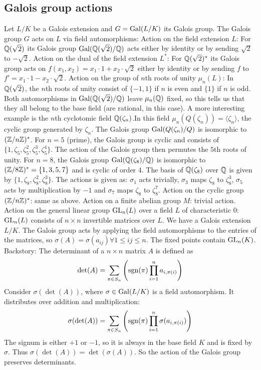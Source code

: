 \subsection{Galois group actions}
\begin{outline}
\0 Let $L/K$ be a Galois extension and $G=\operatorname{Gal}({L/K})$ its Galois group. The Galois group $G$ acts on $L$ via field automorphisms:
    \1 Action on the field extension $L$: For $\mathbb{Q}(\sqrt{2})$ its Galois group $\operatorname{Gal}({\mathbb{Q}(\sqrt{2})/\mathbb{Q}})$ acts either by identity or by sending $\sqrt{2}$ to $-\sqrt{2}$.
    \1 Action on the dual of the field extension $L^*$: For $\mathbb{Q}(\sqrt{2})^*$ its Galois group acts on $f(x_1,x_2)=x_1\cdot 1 + x_2 \cdot \sqrt{2}$ either by identity or by sending $f$ to $f'=x_1\cdot 1 -x_2 \cdot \sqrt{2}$.
    \1 Action on the group of $n$th roots of unity $\mu_n(L)$: 
        \2 In $\mathbb{Q}(\sqrt{2})$, the $n$th roots of unity consist of $\{-1,1\}$ if $n$ is even and $\{1\}$ if $n$ is odd. Both automorphisms in $\operatorname{Gal}({\mathbb{Q}(\sqrt{2})/\mathbb{Q}})$ leave $\mu_n(\mathbb{Q})$ fixed, so this tells us that they all belong to the base field (are rational, in this case). 
        \2 A more interesting example is the $n$th cyclotomic field $\mathbb{Q}(\zeta_n)$.In this field $\mu_n (Q(\zeta_n))=\langle \zeta_n \rangle$, the cyclic group generated by $\zeta_n$. The Galois group $\operatorname{Gal}({Q(\zeta_n)/Q})$ is isomorphic to $(\mathbb{Z}/n\mathbb{Z})^*$. For $n=5$ (prime), the Galois group is cyclic and consists of $\{1, \zeta_5, \zeta_5^2, \zeta_5^3, \zeta_5^4\}$. The action of the Galois group then permutes the $5$th roots of unity. For $n=8$, the Galois group $\operatorname{Gal}({\mathbb{Q}(\zeta_8)/\mathbb{Q}})$ is isomorphic to $(\mathbb{Z}/8\mathbb{Z})^*=\{1,3,5,7\}$ and is cyclic of order $4$. The basis of $\mathbb{Q}(\zeta_8)$ over $\mathbb{Q}$ is given by $\{1,\zeta_8,\zeta_8^2, \zeta_8^3\}$. The actions is given as: $\sigma_1$ acts trivially, $\sigma_3$ maps $\zeta_8$ to $\zeta_8^3$, $\sigma_5$ acts by multiplication by $-1$ and $\sigma_7$ maps $\zeta_8$ to $\zeta^7_8$.
    \1 Action on the cyclic group $(\mathbb{Z}/n\mathbb{Z})^*$: same as above.
    \1 Action on a finite abelian group $M$: trivial action.
    \1 Action on the general linear group $\operatorname{GL}_n(L)$ over a field $L$ of characteristic $0$: $\operatorname{GL}_n(L)$ consists of $n\times n$ invertible matrices over $L$. We have a Galois extension $L/K$. The Galois group acts by applying the field automorphisms to the entries of the matrices, so $\sigma(A)=\sigma(a_{ij}) \forall 1\leq ij \leq n$. The fixed points contain $\operatorname{GL}_n(K)$.
        \2 Backstory: The determinant of a $n\times n$ matrix $A$ is defined as 
        $$\det(A) = \sum_{\pi \in S_n} \left( \operatorname{sgn}(\pi) \prod_{i=1}^n a_{i,\pi(i)} \right)$$
        Consider $\sigma(\det (A))$, where $\sigma \in \operatorname{Gal}({L/K})$ is a field automorphism. It distributes over addition and multiplication:
        $$\sigma(\det(A)) = \sum_{\pi \in S_n} \left( \operatorname{sgn}(\pi) \prod_{i=1}^n \sigma(a_{i,\pi(i)}) \right)$$
        The signum is either $+1$ or $-1$, so it is always in the base field $K$ and is fixed by $\sigma$. Thus $\sigma(\det(A))=\det(\sigma(A))$. So the action of the Galois group preserves determinants.
\end{outline}

